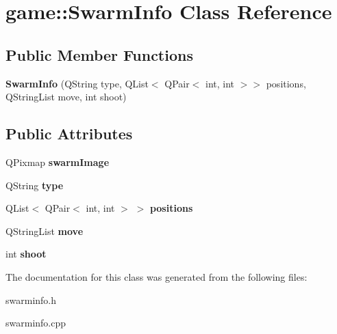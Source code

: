 \hypertarget{classgame_1_1SwarmInfo}{}\section{game\+:\+:Swarm\+Info Class Reference}
\label{classgame_1_1SwarmInfo}
\subsection*{Public Member Functions}
\begin{DoxyCompactItemize}
\item 
\mbox{\label{classgame_1_1SwarmInfo_a9409cbebf4b9e4eede6b46dfda8ad893}} 
{\bfseries Swarm\+Info} (Q\+String type, Q\+List$<$ Q\+Pair$<$ int, int $>$$>$ positions, Q\+String\+List move, int shoot)
\end{DoxyCompactItemize}
\subsection*{Public Attributes}
\begin{DoxyCompactItemize}
\item 
\mbox{\label{classgame_1_1SwarmInfo_a8b0dda6f67ca7b7569e01dc9b1b7af7d}} 
Q\+Pixmap {\bfseries swarm\+Image}
\item 
\mbox{\label{classgame_1_1SwarmInfo_a241887ba92116612fb74ec5620877ce4}} 
Q\+String {\bfseries type}
\item 
\mbox{\label{classgame_1_1SwarmInfo_aad578fbd8c715b8704406c13761e2e02}} 
Q\+List$<$ Q\+Pair$<$ int, int $>$ $>$ {\bfseries positions}
\item 
\mbox{\label{classgame_1_1SwarmInfo_aa4eeb90d8e86e13abd7a5a4ed9f7b8ce}} 
Q\+String\+List {\bfseries move}
\item 
\mbox{\label{classgame_1_1SwarmInfo_ac5d96ddf1d4e3cedd0d8f3ce0da9fe37}} 
int {\bfseries shoot}
\end{DoxyCompactItemize}


The documentation for this class was generated from the following files\+:\begin{DoxyCompactItemize}
\item 
swarminfo.\+h\item 
swarminfo.\+cpp\end{DoxyCompactItemize}
